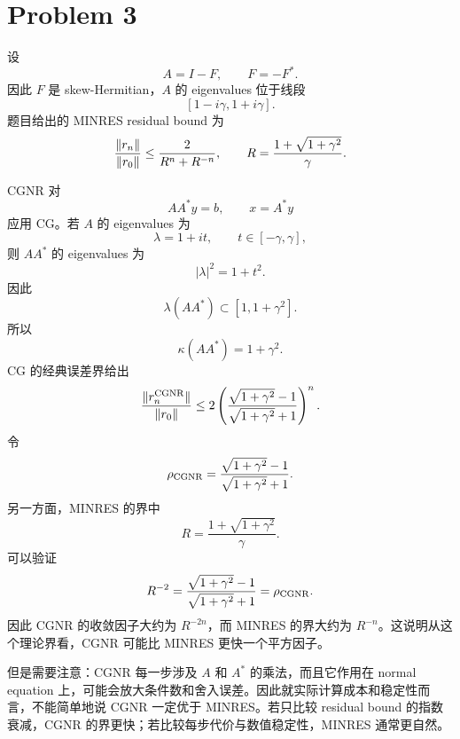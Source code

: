 \documentclass{ctexart}
\DeclarePairedDelimiter{\norm}{\lVert}{\rVert}
\begin{document}
\section*{Problem 3}
\begin{solution}

  设
  \[
    A=I-F, \qquad F=-F^*.
  \]
  因此 $F$ 是 skew-Hermitian，$A$ 的 eigenvalues 位于线段
  \[
    [1-i\gamma,1+i\gamma].
  \]
  题目给出的 MINRES residual bound 为
  \[
    \frac{\norm{r_n}}{\norm{r_0}}\le \frac{2}{R^n+R^{-n}},
    \qquad
    R=\frac{1+\sqrt{1+\gamma^2}}{\gamma}.
  \]

  CGNR 对
  \[
    AA^*y=b, \qquad x=A^*y
  \]
  应用 CG。若 $A$ 的 eigenvalues 为
  \[
    \lambda=1+i t, \qquad t\in[-\gamma,\gamma],
  \]
  则 $AA^*$ 的 eigenvalues 为
  \[
    |\lambda|^2=1+t^2.
  \]
  因此
  \[
    \lambda(AA^*)\subset [1,1+\gamma^2].
  \]
  所以
  \[
    \kappa(AA^*)=1+\gamma^2.
  \]
  CG 的经典误差界给出
  \[
    \frac{\norm{r_n^{\rm CGNR}}}{\norm{r_0}}
    \le
    2\left(\frac{\sqrt{1+\gamma^2}-1}{\sqrt{1+\gamma^2}+1}\right)^n.
  \]
  令
  \[
    \rho_{\rm CGNR}=\frac{\sqrt{1+\gamma^2}-1}{\sqrt{1+\gamma^2}+1}.
  \]
  另一方面，MINRES 的界中
  \[
    R=\frac{1+\sqrt{1+\gamma^2}}{\gamma}.
  \]
  可以验证
  \[
    R^{-2}=\frac{\sqrt{1+\gamma^2}-1}{\sqrt{1+\gamma^2}+1}=\rho_{\rm CGNR}.
  \]
  因此 CGNR 的收敛因子大约为 $R^{-2n}$，而 MINRES 的界大约为 $R^{-n}$。这说明从这个理论界看，CGNR 可能比 MINRES 更快一个平方因子。

  但是需要注意：CGNR 每一步涉及 $A$ 和 $A^*$ 的乘法，而且它作用在 normal equation 上，可能会放大条件数和舍入误差。因此就实际计算成本和稳定性而言，不能简单地说 CGNR 一定优于 MINRES。若只比较 residual bound 的指数衰减，CGNR 的界更快；若比较每步代价与数值稳定性，MINRES 通常更自然。

\end{solution}
\end{document}

